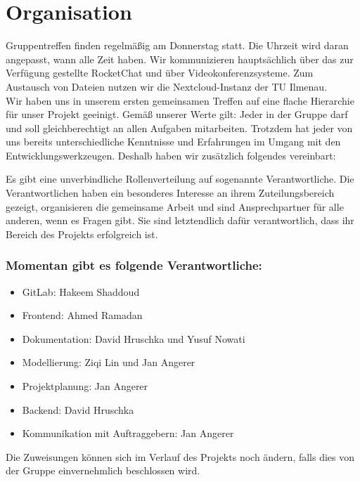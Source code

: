 \section{Organisation}
Gruppentreffen finden regelmäßig am Donnerstag statt. Die Uhrzeit wird daran angepasst, wann alle Zeit haben. Wir kommunizieren hauptsächlich über das zur Verfügung gestellte RocketChat und über Videokonferenzsysteme. Zum Austausch von Dateien nutzen wir die Nextcloud-Instanz der TU Ilmenau. \\

\noindent Wir haben uns in unserem ersten gemeinsamen Treffen auf eine flache Hierarchie für unser Projekt geeinigt. Gemäß unserer Werte  gilt: Jeder in der Gruppe darf und soll gleichberechtigt an allen Aufgaben mitarbeiten. Trotzdem hat jeder von uns bereits unterschiedliche Kenntnisse und Erfahrungen im Umgang mit den Entwicklungswerkzeugen. Deshalb haben wir zusätzlich folgendes vereinbart:

\noindent Es gibt eine unverbindliche Rollenverteilung auf sogenannte Verantwortliche. Die Verantwortlichen haben ein besonderes Interesse an ihrem Zuteilungsbereich gezeigt, organisieren die gemeinsame Arbeit und sind Ansprechpartner für alle anderen, wenn es Fragen gibt. Sie sind letztendlich dafür verantwortlich, dass ihr Bereich des Projekts erfolgreich ist.\\

\subsubsection*{Momentan gibt es folgende Verantwortliche:}
\begin{itemize}
    \item GitLab: Hakeem Shaddoud
    \item Frontend: Ahmed Ramadan
    \item Dokumentation: David Hruschka und Yusuf Nowati
    \item Modellierung: Ziqi Lin und  Jan Angerer
    \item Projektplanung: Jan Angerer
    \item Backend: David Hruschka
    \item Kommunikation mit Auftraggebern: Jan Angerer
\end{itemize}{}
\vspace{0,5cm}
\noindent Die Zuweisungen können sich im Verlauf des Projekts noch ändern, falls dies von der Gruppe einvernehmlich beschlossen wird.